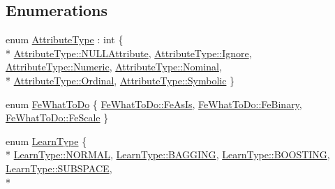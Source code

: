 \subsection*{Enumerations}
\begin{DoxyCompactItemize}
\item 
enum \hyperlink{namespace_k_k_m_l_l_a99973706982b59debba670e2480555ab}{Attribute\+Type} \+: int \{ \\*
\hyperlink{namespace_k_k_m_l_l_a99973706982b59debba670e2480555abad76980f2bce5d0db714f2b125268dd6c}{Attribute\+Type\+::\+N\+U\+L\+L\+Attribute}, 
\hyperlink{namespace_k_k_m_l_l_a99973706982b59debba670e2480555abafd038fc7f319e48f3115d92bf5bdbef9}{Attribute\+Type\+::\+Ignore}, 
\hyperlink{namespace_k_k_m_l_l_a99973706982b59debba670e2480555aba87322391cc6e8948ce9fd5d6cb84fced}{Attribute\+Type\+::\+Numeric}, 
\hyperlink{namespace_k_k_m_l_l_a99973706982b59debba670e2480555aba8c28d7c312116b8a46e2f466cb33d5b4}{Attribute\+Type\+::\+Nominal}, 
\\*
\hyperlink{namespace_k_k_m_l_l_a99973706982b59debba670e2480555abac9d539922221d77591558b5841d36fd1}{Attribute\+Type\+::\+Ordinal}, 
\hyperlink{namespace_k_k_m_l_l_a99973706982b59debba670e2480555abaaddee1396a3e20ceea8071ed6da54866}{Attribute\+Type\+::\+Symbolic}
 \}
\item 
enum \hyperlink{namespace_k_k_m_l_l_aa7a52865d78241e93b30731e46f99b43}{Fe\+What\+To\+Do} \{ \hyperlink{namespace_k_k_m_l_l_aa7a52865d78241e93b30731e46f99b43a8fdde05abb9506fd4caa93ddc4490a13}{Fe\+What\+To\+Do\+::\+Fe\+As\+Is}, 
\hyperlink{namespace_k_k_m_l_l_aa7a52865d78241e93b30731e46f99b43ab88633cd9a2d1569dc1979a5e5cb1752}{Fe\+What\+To\+Do\+::\+Fe\+Binary}, 
\hyperlink{namespace_k_k_m_l_l_aa7a52865d78241e93b30731e46f99b43aa6a59adc4c0770972e52a9c13d0720f3}{Fe\+What\+To\+Do\+::\+Fe\+Scale}
 \}
\item 
enum \hyperlink{namespace_k_k_m_l_l_ad04a2a0ed8cef5043307eea95c6a31bc}{Learn\+Type} \{ \\*
\hyperlink{namespace_k_k_m_l_l_ad04a2a0ed8cef5043307eea95c6a31bca1e23852820b9154316c7c06e2b7ba051}{Learn\+Type\+::\+N\+O\+R\+M\+AL}, 
\hyperlink{namespace_k_k_m_l_l_ad04a2a0ed8cef5043307eea95c6a31bca11c1d473f0903826ac0c5b8763b58b44}{Learn\+Type\+::\+B\+A\+G\+G\+I\+NG}, 
\hyperlink{namespace_k_k_m_l_l_ad04a2a0ed8cef5043307eea95c6a31bca701d1757588b2e8c1b007e488913a1cf}{Learn\+Type\+::\+B\+O\+O\+S\+T\+I\+NG}, 
\hyperlink{namespace_k_k_m_l_l_ad04a2a0ed8cef5043307eea95c6a31bca75420cb18c5b572ad779b8c95d797cf6}{Learn\+Type\+::\+S\+U\+B\+S\+P\+A\+CE}, 
\\*

\end{DoxyCompactItemize}
